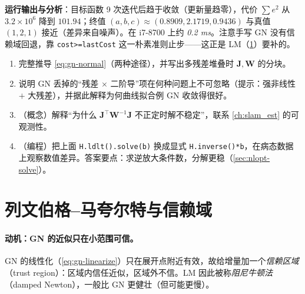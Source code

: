 \noindent\textbf{运行输出与分析}\cite{gaoxiang2019slam14}：目标函数 9 次迭代后趋于收敛（更新量趋零），代价 $\sum e^2$ 从 $3.2\times10^6$ 降到 $101.94$；终值 $(a,b,c)\approx(0.8909,2.1719,0.9436)$ 与真值 $(1,2,1)$ 接近（差异来自噪声）。在 i7-8700 上约 \emph{0.2 ms}。注意手写 GN 没有信赖域回退，靠 \texttt{cost>=lastCost} 这一朴素准则止步——这正是 LM（\cref{sec:nlopt-lm}）要补的。

\begin{practice}
\begin{enumerate}
  \item 完整推导 \cref{eq:gn-normal}（两种途径），并写出多残差堆叠时 $\mathbf{J},\mathbf{W}$ 的分块。
  \item 说明 GN 丢掉的“残差 $\times$ 二阶导”项在何种问题上不可忽略（提示：强非线性 $+$ 大残差），并据此解释为何曲线拟合例 GN 收敛得很好。
  \item （概念）解释“为什么 $\mathbf{J}^\top\mathbf{W}^{-1}\mathbf{J}$ 不正定时解不稳定”，联系 \cref{ch:slam_est} 的可观测性。
  \item （编程）把上面 \texttt{H.\allowbreak ldlt().\allowbreak solve(b)} 换成显式 \texttt{H.\allowbreak inverse()*b}，在病态数据上观察数值差异。答案要点：求逆放大条件数，分解更稳（\cref{sec:nlopt-solve}）。
\end{enumerate}
\end{practice}

\section{列文伯格–马夸尔特与信赖域}
\label{sec:nlopt-lm}

\paragraph{动机：GN 的近似只在小范围可信。}
GN 的线性化（\cref{eq:gn-linearize}）只在展开点附近有效，故给增量加一个\emph{信赖区域}（trust region）：区域内信任近似，区域外不信\cite{gaoxiang2019slam14,carlone2026handbook}。LM 因此被称\emph{阻尼牛顿法}（damped Newton），一般比 GN 更健壮（但可能更慢）。

